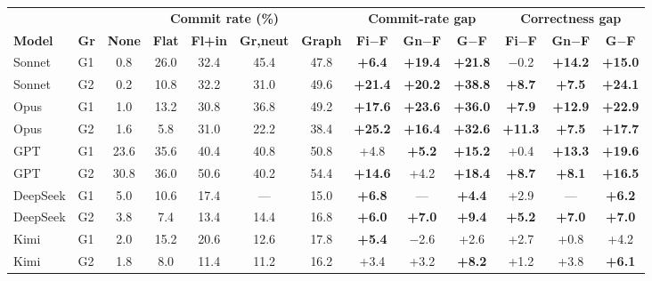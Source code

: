\documentclass[11pt]{article}
\begin{document}
\begin{table}[t]
\centering
\footnotesize
\setlength{\tabcolsep}{5pt}
\setlength{\tabcolsep}{3.6pt}
\begin{tabular}{@{}llccccc|ccc|ccc@{}}
\toprule
 & & \multicolumn{5}{c|}{\textbf{Commit rate (\%)}} & \multicolumn{3}{c|}{\textbf{Commit-rate gap}} & \multicolumn{3}{c}{\textbf{Correctness gap}} \\
\textbf{Model} & \textbf{Gr} & \textbf{None} & \textbf{Flat} & \textbf{Fl+in} & \textbf{Gr,neut} & \textbf{Graph} & \textbf{Fi$-$F} & \textbf{Gn$-$F} & \textbf{G$-$F} & \textbf{Fi$-$F} & \textbf{Gn$-$F} & \textbf{G$-$F} \\
\midrule
Sonnet & G1 & 0.8 & 26.0 & 32.4 & 45.4 & 47.8 & \textbf{+6.4} & \textbf{+19.4} & \textbf{+21.8} & $-$0.2 & \textbf{+14.2} & \textbf{+15.0} \\
Sonnet & G2 & 0.2 & 10.8 & 32.2 & 31.0 & 49.6 & \textbf{+21.4} & \textbf{+20.2} & \textbf{+38.8} & \textbf{+8.7} & \textbf{+7.5} & \textbf{+24.1} \\
Opus & G1 & 1.0 & 13.2 & 30.8 & 36.8 & 49.2 & \textbf{+17.6} & \textbf{+23.6} & \textbf{+36.0} & \textbf{+7.9} & \textbf{+12.9} & \textbf{+22.9} \\
Opus & G2 & 1.6 & 5.8 & 31.0 & 22.2 & 38.4 & \textbf{+25.2} & \textbf{+16.4} & \textbf{+32.6} & \textbf{+11.3} & \textbf{+7.5} & \textbf{+17.7} \\
GPT & G1 & 23.6 & 35.6 & 40.4 & 40.8 & 50.8 & +4.8 & \textbf{+5.2} & \textbf{+15.2} & +0.4 & \textbf{+13.3} & \textbf{+19.6} \\
GPT & G2 & 30.8 & 36.0 & 50.6 & 40.2 & 54.4 & \textbf{+14.6} & +4.2 & \textbf{+18.4} & \textbf{+8.7} & \textbf{+8.1} & \textbf{+16.5} \\
DeepSeek & G1 & 5.0 & 10.6 & 17.4 & --- & 15.0 & \textbf{+6.8} & --- & \textbf{+4.4} & +2.9 & --- & \textbf{+6.2} \\
DeepSeek & G2 & 3.8 & 7.4 & 13.4 & 14.4 & 16.8 & \textbf{+6.0} & \textbf{+7.0} & \textbf{+9.4} & \textbf{+5.2} & \textbf{+7.0} & \textbf{+7.0} \\
Kimi & G1 & 2.0 & 15.2 & 20.6 & 12.6 & 17.8 & \textbf{+5.4} & $-$2.6 & +2.6 & +2.7 & +0.8 & +4.2 \\
Kimi & G2 & 1.8 & 8.0 & 11.4 & 11.2 & 16.2 & +3.4 & +3.2 & \textbf{+8.2} & +1.2 & +3.8 & \textbf{+6.1} \\
\bottomrule
\end{tabular}

\end{table}
\end{document}
